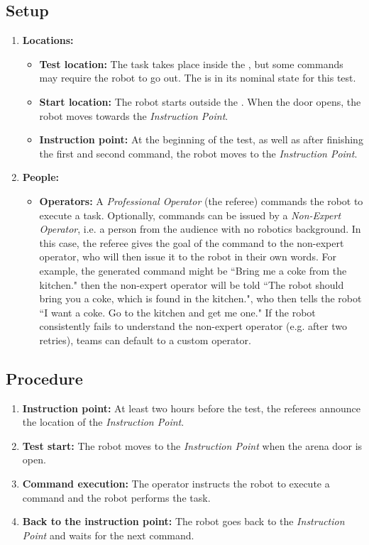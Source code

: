 \subsection*{Setup}
\begin{enumerate}
    \item \textbf{Locations:}
		\begin{itemize}
			\item \textbf{Test location:} The task takes place inside the \Arena{}, but some commands may require the robot to go out. The \Arena{} is in its nominal state for this test.
			\item \textbf{Start location:} The robot starts outside the \Arena{}. When the door opens, the robot moves towards the \textit{Instruction Point}.
			\item \textbf{Instruction point:} At the beginning of the test, as well as after finishing the first and second command, the robot moves to the \textit{Instruction Point}.
		\end{itemize}
	\item \textbf{People:}
		\begin{itemize}
			\item \textbf{Operators:} A \emph{Professional Operator} (the referee) commands the robot to execute a task.
			Optionally, commands can be issued by a \emph{Non-Expert Operator}, i.e. a person from the audience with no robotics background.
			In this case, the referee gives the goal of the command to the non-expert operator, who will then issue it to the robot in their own words. For example, the generated command might be ``Bring me a coke from the kitchen." then the non-expert operator will be told ``The robot should bring you a coke, which is found in the kitchen.", who then tells the robot ``I want a coke. Go to the kitchen and get me one."
			If the robot consistently fails to understand the non-expert operator (e.g. after two retries), teams can default to a custom operator.
		\end{itemize}
\end{enumerate}


\subsection*{Procedure}
\begin{enumerate}[nosep]
	\item \textbf{Instruction point:} At least two hours before the test, the referees announce the location of the \textit{Instruction Point}.
	\item \textbf{Test start:} The robot moves to the \textit{Instruction Point} when the arena door is open.
	\item \textbf{Command execution:} The operator instructs the robot to execute a command and the robot performs the task.
	\item \textbf{Back to the instruction point:} The robot goes back to the \textit{Instruction Point} and waits for the next command.
\end{enumerate}


